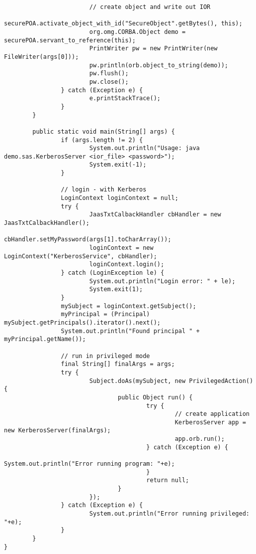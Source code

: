 \begin{scriptsize}
\begin{verbatim}
                        // create object and write out IOR
                        securePOA.activate_object_with_id("SecureObject".getBytes(), this);
                        org.omg.CORBA.Object demo = securePOA.servant_to_reference(this);
                        PrintWriter pw = new PrintWriter(new FileWriter(args[0]));
                        pw.println(orb.object_to_string(demo));
                        pw.flush();
                        pw.close();
                } catch (Exception e) {
                        e.printStackTrace();
                }
        }

        public static void main(String[] args) {
                if (args.length != 2) {
                        System.out.println("Usage: java demo.sas.KerberosServer <ior_file> <password>");
                        System.exit(-1);
                }

                // login - with Kerberos
                LoginContext loginContext = null;
                try {
                        JaasTxtCalbackHandler cbHandler = new JaasTxtCalbackHandler();
                        cbHandler.setMyPassword(args[1].toCharArray());
                        loginContext = new LoginContext("KerberosService", cbHandler);
                        loginContext.login();
                } catch (LoginException le) {
                        System.out.println("Login error: " + le);
                        System.exit(1);
                }
                mySubject = loginContext.getSubject();
                myPrincipal = (Principal) mySubject.getPrincipals().iterator().next();
                System.out.println("Found principal " + myPrincipal.getName());

                // run in privileged mode
                final String[] finalArgs = args;
                try {
                        Subject.doAs(mySubject, new PrivilegedAction() {
                                public Object run() {
                                        try {
                                                // create application
                                                KerberosServer app = new KerberosServer(finalArgs);
                                                app.orb.run();
                                        } catch (Exception e) {
                                                System.out.println("Error running program: "+e);
                                        }
                                        return null;
                                }
                        });
                } catch (Exception e) {
                        System.out.println("Error running privileged: "+e);
                }
        }
}
\end{verbatim}
\end{scriptsize}

